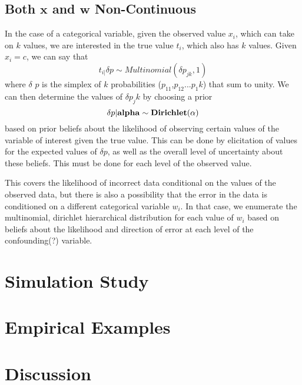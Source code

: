\documentclass[fignum,letterpaper,12pt]{article}
\begin{document}
\subsection{Both $\mathbf{x}$ and $\mathbf{w}$ Non-Continuous} \label{subsec:case4}
In the case of a categorical variable, given the observed value $x_i$, which can take on $k$ values, we are interested in the true value $t_i$, which also has $k$ values. Given $x_i=c$, we can say that
\begin{equation}
t_{i|} \delta p \sim Multinomial (\delta p_{jk},1)
\end{equation}
where $\delta$ $p$ is the simplex of $k$ probabilities ($p_11$,$p_12$...$p_1k$) that sum to unity. We can then determine the values of $\delta p_jk$ by choosing a prior
\begin{equation}
\delta p|\bf{alpha} \sim Dirichlet(\bf{\alpha})
\end{equation}
based on prior beliefs about the likelihood of observing certain values of the variable of interest given the true value. This can be done by elicitation of values for the expected values of $\delta p$, as well as the overall level of uncertainty about these beliefs. This must be done for each level of the observed value.

This covers the likelihood of incorrect data conditional on the values of the observed data, but there is also a possibility that the error in the data is conditioned on a different categorical variable $w_i$. In that case, we enumerate the multinomial, dirichlet hierarchical distribution for each value of $w_i$ based on beliefs about the likelihood and direction of error at each level of the confounding(?) variable.



\section{Simulation Study} \label{sec:simulation}



\section{Empirical Examples} \label{sec:examples}



\section{Discussion} \label{sec:conclusion}



\clearpage
\singlespacing
{}

\end{document}
